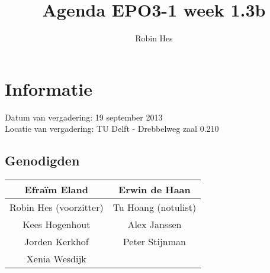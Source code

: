 \documentclass{article}
\begin{document}
\title{Agenda EPO3-1 week 1.3b}%
\author{Robin Hes}%
\maketitle

\section*{Informatie}
Datum van vergadering: 19 september 2013\\ %
Locatie van vergadering: TU Delft - Drebbelweg zaal 0.210 %
\subsection*{Genodigden}
\begin{center}
\begin{tabular}{|c |c |}
	\hline
	Efraïm Eland & Erwin de Haan \\
	\hline
	Robin Hes (voorzitter) & Tu Hoang (notulist)\\
	\hline
	Kees Hogenhout & Alex Janssen\\
	\hline
	Jorden Kerkhof & Peter Stijnman \\
	\hline
	Xenia Wesdijk & \\
	\hline
\end{tabular}
\end{center}
\end{document}
